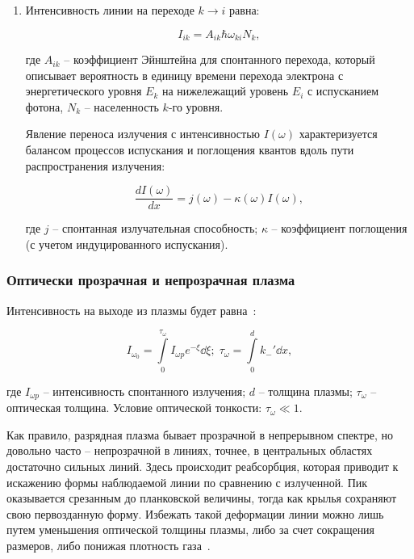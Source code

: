 \documentclass[10pt, a4paper]{article}
\begin{document}
\begin{enumerate}
	\item Интенсивность линии на переходе
$k\rightarrow i$ равна:

	\begin{equation*}
		I_{ik} = A_{ik}\hbar\omega_{ki}N_k,
	\end{equation*}	
	
	где $A_{ik}$ -- коэффициент Эйнштейна для спонтанного перехода,
	который описывает вероятность в единицу времени перехода
	электрона с энергетического уровня $E_k$ на нижележащий 
	уровень $E_i$ с испусканием фотона, $N_k$ -- населенность $k$-го уровня.
		
	Явление переноса излучения с интенсивностью $I(\omega)$ характеризуется балансом процессов испускания и поглощения
	квантов вдоль пути распространения излучения:
	
	\begin{equation}
		\frac{dI(\omega)}{dx}=j(\omega)-\kappa(\omega)I(\omega),
	\end{equation}

	где $j$ -- спонтанная излучательная способность; $\kappa$ -- коэффициент поглощения (с учетом индуцированного испускания).
	
\end{enumerate}

\subsubsection{Оптически прозрачная и непрозрачная плазма}

Интенсивность на выходе из плазмы будет равна~\cite{raizer}:

\begin{equation*}
	I_{\omega_0} = \int\limits_0^{\tau_\omega} I_{\omega p}e^{-\xi}\dd{\xi}; \; \tau_\omega = \int\limits_0^dk_{-}'\dd{x},
\end{equation*}

где $I_{\omega p}$ -- интенсивность спонтанного излучения; $d$ -- толщина плазмы; $\tau_\omega$ -- оптическая толщина. Условие оптической тонкости: $\tau_\omega\ll1$.

Как правило, разрядная плазма бывает прозрачной в непрерывном спектре, но довольно часто -- непрозрачной в линиях, точнее, в центральных областях достаточно сильных линий. Здесь происходит реабсорбция, которая приводит к искажению формы наблюдаемой линии по сравнению с излученной. Пик оказывается срезанным до планковской величины, тогда как крылья сохраняют свою первозданную форму. Избежать такой деформации линии можно лишь путем уменьшения оптической толщины плазмы, либо за счет сокращения размеров, либо понижая плотность газа~\cite{raizer}.	
\end{document}
